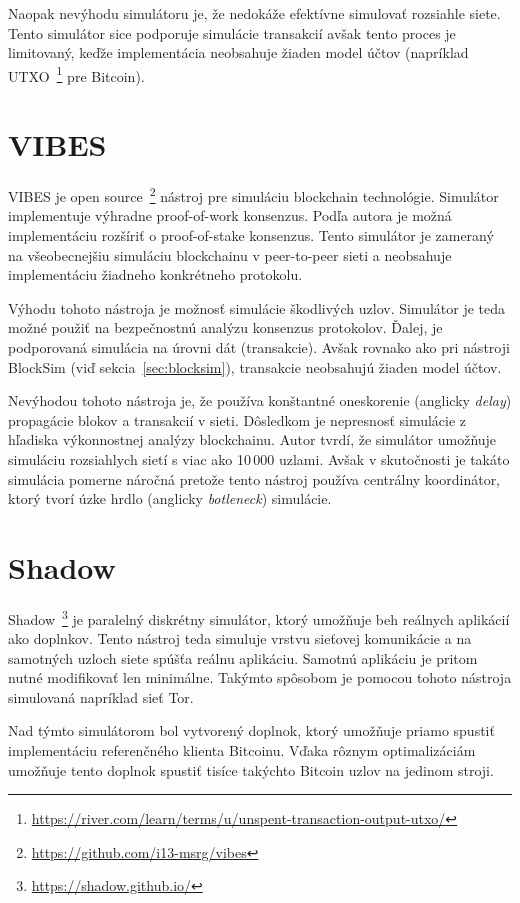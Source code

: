 Naopak nevýhodu simulátoru je, že nedokáže efektívne simulovať rozsiahle siete. Tento simulátor sice podporuje simulácie transakcií avšak tento proces je limitovaný, keďže implementácia neobsahuje žiaden model účtov (napríklad UTXO~\footnote{\url{https://river.com/learn/terms/u/unspent-transaction-output-utxo/}} pre Bitcoin).~\cite{fanPerfEval}

\section{VIBES}

VIBES je open source~\footnote{\url{https://github.com/i13-msrg/vibes}} nástroj pre simuláciu blockchain technológie. Simulátor implementuje výhradne proof-of-work konsenzus. Podľa autora je možná implementáciu rozšíriť o proof-of-stake konsenzus. Tento simulátor je zameraný na všeobecnejšiu simuláciu blockchainu v peer-to-peer sieti a neobsahuje implementáciu žiadneho konkrétneho protokolu.~\cite{vibesWp}

Výhodu tohoto nástroja je možnosť simulácie škodlivých uzlov. Simulátor je teda možné použiť na bezpečnostnú analýzu konsenzus protokolov. Ďalej, je podporovaná simulácia na úrovni dát (transakcie). Avšak rovnako ako pri nástroji BlockSim (viď sekcia~\ref{sec:blocksim}), transakcie neobsahujú žiaden model účtov.

Nevýhodou tohoto nástroja je, že používa konštantné oneskorenie (anglicky \textit{delay}) propagácie blokov a transakcií v sieti. Dôsledkom je nepresnosť simulácie z hľadiska výkonnostnej analýzy blockchainu. Autor tvrdí, že simulátor umožňuje simuláciu rozsiahlych sietí s viac ako 10\,000 uzlami. Avšak v skutočnosti je takáto simulácia pomerne náročná pretože tento nástroj používa centrálny koordinátor, ktorý tvorí úzke hrdlo (anglicky \textit{botleneck}) simulácie.\cite{fanPerfEval}

\section{Shadow}

Shadow~\footnote{\url{https://shadow.github.io/}} je paralelný diskrétny simulátor, ktorý umožňuje beh reálnych aplikácií ako doplnkov. Tento nástroj teda simuluje vrstvu sieťovej komunikácie a na samotných uzloch siete spúšťa reálnu aplikáciu. Samotnú aplikáciu je pritom nutné modifikovať len minimálne. Takýmto spôsobom je pomocou tohoto nástroja simulovaná napríklad sieť Tor.~\cite{shadowTor}

Nad týmto simulátorom bol vytvorený doplnok, ktorý umožňuje priamo spustiť implementáciu referenčného klienta Bitcoinu. Vďaka rôznym optimalizáciám umožňuje tento doplnok spustiť tisíce takýchto Bitcoin uzlov na jedinom stroji.

